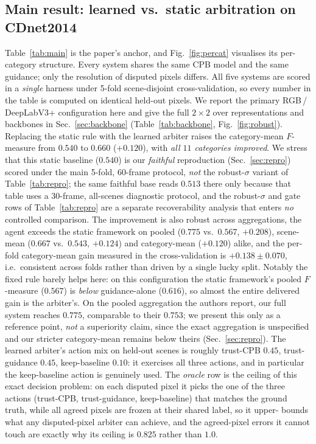 \documentclass[sn-basic]{sn-jnl}
\newcommand{\Fm}{$F$-measure}
\begin{document}
\subsection{Main result: learned vs.\ static arbitration on CDnet2014}
\label{sec:main}
Table~\ref{tab:main} is the paper's anchor, and Fig.~\ref{fig:percat} visualises its
per-category structure. Every system shares the same CPB model and the same guidance;
only the resolution of disputed pixels differs. All five systems are scored in a
\emph{single} harness under 5-fold scene-disjoint cross-validation, so every
number in the table is computed on identical held-out pixels. We report the primary
RGB\,/\,DeepLabV3+ configuration here and give the full $2\times2$ over representations
and backbones in Sec.~\ref{sec:backbone} (Table~\ref{tab:backbone},
Fig.~\ref{fig:robust}). Replacing the static
rule with the learned arbiter raises the category-mean \Fm{} from $0.540$ to $0.660$
($+0.120$), with \emph{all $11$ categories improved}. We stress that this static
baseline ($0.540$) is our \emph{faithful} reproduction (Sec.~\ref{sec:repro}) scored
under the main 5-fold, 60-frame protocol, \emph{not} the robust-$\sigma$ variant of
Table~\ref{tab:repro}; the same faithful base reads $0.513$ there only because that
table uses a 30-frame, all-scenes diagnostic protocol, and the robust-$\sigma$ and gate
rows of Table~\ref{tab:repro} are a separate recoverability analysis that enters
\emph{no} controlled comparison. The improvement is also robust
across aggregations, the agent exceeds the static framework on pooled ($0.775$ vs.\
$0.567$, $+0.208$), scene-mean ($0.667$ vs.\ $0.543$, $+0.124$) and category-mean
($+0.120$) alike, and the per-fold category-mean gain measured in the
cross-validation is $+0.138 \pm 0.070$, i.e.\ consistent across folds rather than
driven by a single lucky split. Notably the fixed rule barely helps here: on this
configuration the static framework's pooled \Fm{} ($0.567$) is \emph{below}
guidance-alone ($0.616$), so almost the entire delivered gain is the arbiter's. On the
pooled aggregation the authors report, our full system reaches $0.775$, comparable to
their $0.753$; we present this only as a reference point, \emph{not} a superiority claim,
since the exact aggregation is unspecified and our stricter category-mean remains below
theirs (Sec.~\ref{sec:repro}). The learned arbiter's action mix on held-out scenes
is roughly trust-CPB $0.45$, trust-guidance $0.45$, keep-baseline $0.10$: it exercises
all three actions, and in particular the keep-baseline action is genuinely used. The
\emph{oracle} row is the ceiling of this exact decision problem: on each disputed pixel it
picks the one of the three actions (trust-CPB, trust-guidance, keep-baseline) that matches
the ground truth, while all agreed pixels are frozen at their shared label, so it upper-
bounds what any disputed-pixel arbiter can achieve, and the agreed-pixel errors it cannot
touch are exactly why its ceiling is $0.825$ rather than $1.0$.
\end{document}
